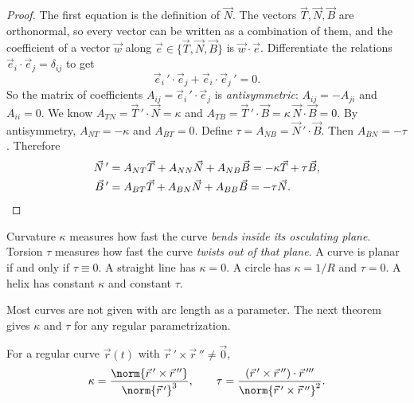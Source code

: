 \begin{proof}
The first equation is the definition of $\vec N$. The vectors $\vec T,\vec N,\vec B$ are orthonormal, so every vector can be written as a combination of them, and the coefficient of a vector $\vec w$ along $\vec e\in\{\vec T,\vec N,\vec B\}$ is $\vec w\cdot\vec e$. Differentiate the relations $\vec e_i\cdot\vec e_j=\delta_{ij}$ to get
\[
\vec e_i\,'\cdot\vec e_j+\vec e_i\cdot\vec e_j\,'=0 .
\]
So the matrix of coefficients $A_{ij}=\vec e_i\,'\cdot\vec e_j$ is \emph{antisymmetric}: $A_{ij}=-A_{ji}$ and $A_{ii}=0$. We know $A_{TN}=\vec T\,'\cdot\vec N=\kappa$ and $A_{TB}=\vec T\,'\cdot\vec B=\kappa\,\vec N\cdot\vec B=0$. By antisymmetry, $A_{NT}=-\kappa$ and $A_{BT}=0$. Define $\tau=A_{NB}=\vec N\,'\cdot\vec B$. Then $A_{BN}=-\tau$. Therefore
\begin{align*}
\vec N\,'&=A_{NT}\vec T+A_{NN}\vec N+A_{NB}\vec B=-\kappa\vec T+\tau\vec B,\\
\vec B\,'&=A_{BT}\vec T+A_{BN}\vec N+A_{BB}\vec B=-\tau\vec N. \qedhere
\end{align*}
\end{proof}

\begin{intuition}
Curvature $\kappa$ measures how fast the curve \emph{bends inside its osculating plane}. Torsion $\tau$ measures how fast the curve \emph{twists out of that plane}. A curve is planar if and only if $\tau\equiv0$. A straight line has $\kappa=0$. A circle has $\kappa=1/R$ and $\tau=0$. A helix has constant $\kappa$ and constant $\tau$.
\end{intuition}

Most curves are not given with arc length as a parameter. The next theorem gives $\kappa$ and $\tau$ for any regular parametrization.

\begin{theorem}\label{thm:kappageneral}
For a regular curve $\vec r(t)$ with $\vec r\,'\times\vec r\,''\neq\vec 0$,
\[
\kappa=\frac{\norm{\vec r\,'\times\vec r\,''}}{\norm{\vec r\,'}^3},\qquad
\tau=\frac{(\vec r\,'\times\vec r\,'')\cdot\vec r\,'''}{\norm{\vec r\,'\times\vec r\,''}^2}.
\]
\end{theorem}


